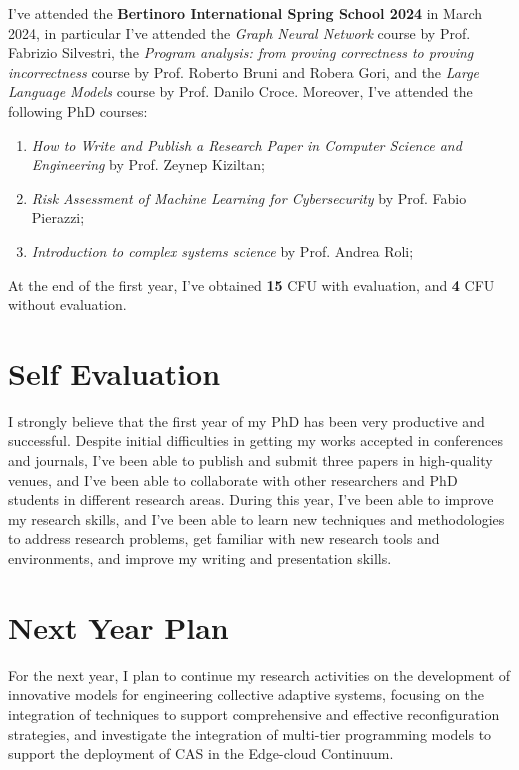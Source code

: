 \documentclass[runningheads]{llncs}
\begin{document}
I've attended the \textbf{Bertinoro International Spring School 2024} in March 2024,
in particular I've attended the \emph{Graph Neural Network} course by Prof. Fabrizio Silvestri,
the \emph{Program analysis: from proving correctness to proving incorrectness} course by Prof. Roberto Bruni and Robera Gori,
and the \emph{Large Language Models} course by Prof. Danilo Croce.
%
Moreover,
I've attended the following PhD courses:
\begin{enumerate}
    \item \emph{How to Write and Publish a Research Paper in Computer Science and Engineering} by Prof. Zeynep Kiziltan;
    \item \emph{Risk Assessment of Machine Learning for Cybersecurity} by Prof. Fabio Pierazzi;
    \item \emph{Introduction to complex systems science} by Prof. Andrea Roli;
\end{enumerate}
At the end of the first year,
I've obtained \textbf{15} CFU with evaluation, and \textbf{4} CFU without evaluation.

\section{Self Evaluation}

I strongly believe that the first year of my PhD has been very productive and successful.
%
Despite initial difficulties in getting my works accepted in conferences and journals,
I've been able to publish and submit three papers in high-quality venues,
and I've been able to collaborate with other researchers and PhD students in different research areas.
%
During this year,
I've been able to improve my research skills,
and I've been able to learn new techniques and methodologies to address research problems,
get familiar with new research tools and environments,
and improve my writing and presentation skills.

\section{Next Year Plan}

For the next year,
I plan to continue my research activities on the development of innovative models for engineering collective adaptive systems,
focusing on the integration of techniques to support comprehensive and effective reconfiguration strategies,
and investigate the integration of multi-tier programming models to support the deployment of CAS in the Edge-cloud Continuum.

%
%
%
% 
% 
\printbibliography
\end{document}
